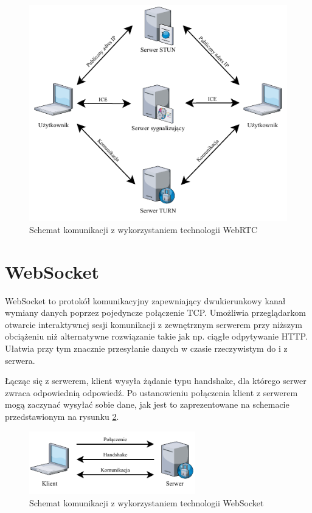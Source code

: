 \documentclass[language=polish,type=master]{aghmodern}
\begin{document}
\begin{figure}[H]
    \centering
    \vspace*{15pt}
    \includegraphics[width=\textwidth]{images/webrtc.pdf}
    \caption{Schemat komunikacji z wykorzystaniem technologii WebRTC}
    \label{fig:webrtc}
\end{figure}

\pagebreak

\section{WebSocket}
WebSocket to protokół komunikacyjny zapewniający dwukierunkowy kanał wymiany danych poprzez pojedyncze połączenie TCP.
Umożliwia przeglądarkom otwarcie interaktywnej sesji komunikacji z zewnętrznym serwerem przy niższym obciążeniu niż alternatywne rozwiązanie takie jak np. ciągłe odpytywanie HTTP.
Ułatwia przy tym znacznie przesyłanie danych w czasie rzeczywistym do i z serwera.

Łącząc się z serwerem, klient wysyła żądanie typu handshake\footnotemark{}, dla którego serwer zwraca odpowiednią odpowiedź.
Po ustanowieniu połączenia klient z serwerem mogą zaczynać wysyłać sobie dane, jak jest to zaprezentowane na schemacie przedstawionym na rysunku \ref{fig:websocket}.

\begin{figure}[H]
    \centering
    \vspace*{15pt}
    \includegraphics[width=0.6435\textwidth]{images/websocket.pdf}
    \caption{Schemat komunikacji z wykorzystaniem technologii WebSocket}
    \label{fig:websocket}
\end{figure}
\end{document}
